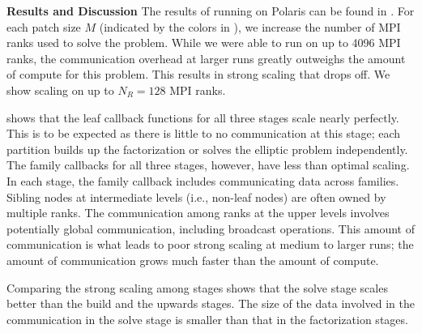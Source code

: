 {\bf Results and Discussion}
The results of running on Polaris can be found in . For each patch size $M$ (indicated by the colors in ), we increase the number of MPI ranks used to solve the problem. While we were able to run on up to 4096 MPI ranks, the communication overhead at larger runs greatly outweighs the amount of compute for this problem. This results in strong scaling that drops off. We show scaling on up to $N_R = 128$ MPI ranks.

 shows that the leaf callback functions for all three stages scale nearly perfectly. This is to be expected as there is little to no communication at this stage; each partition builds up the factorization or solves the elliptic problem independently. The family callbacks for all three stages, however, have less than optimal scaling. In each stage, the family callback includes communicating data across families. Sibling nodes at intermediate levels (i.e., non-leaf nodes) are often owned by multiple ranks. The communication among ranks at the upper levels involves potentially global communication, including broadcast operations. This amount of communication is what leads to poor strong scaling at medium to larger runs; the amount of communication grows much faster than the amount of compute.

Comparing the strong scaling among stages shows that the solve stage scales better than the build and the upwards stages. The size of the data involved in the communication in the solve stage is smaller than that in the factorization stages.

